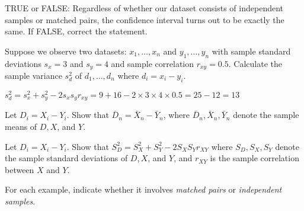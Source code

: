 \documentclass[addpoints,12pt]{exam}
\begin{document}
\begin{questions}
  \question TRUE or FALSE: Regardless of whether our dataset consists of independent samples or matched pairs, the confidence interval turns out to be exactly the same. If FALSE, correct the statement.

  \question Suppose we observe two datasets: $x_1, \dots, x_n$ and $y_1, \dots, y_n$ with sample standard deviations $s_x = 3$ and $s_y = 4$ and sample correlation $r_{xy} = 0.5$.
  Calculate the sample variance $s_d^2$ of $d_1, \dots, d_n$ where $d_i = x_i - y_i$.
  \begin{solution}
    $s_d^2 = s_x^2 + s_y^2 - 2 s_x s_y r_{xy} = 9 + 16 - 2 \times 3 \times 4 \times 0.5 = 25 - 12 = 13$
  \end{solution}

\question Let $D_i = X_i - Y_i$. Show that $\bar{D}_n = \bar{X}_n - \bar{Y}_n$, where $\bar{D}_n, \bar{X}_n, \bar{Y}_n$ denote the sample means of $D, X$, and  $Y$.

\question Let $D_i = X_i - Y_i$. Show that $S_D^2 = S_X^2 + S_Y^2 - 2 S_X S_Y r_{XY}$ where $S_D, S_X, S_Y$ denote the sample standard deviations of $D, X$, and $Y$, and $r_{XY}$ is the sample correlation between $X$ and $Y$.

\question For each example, indicate whether it involves \emph{matched pairs} or \emph{independent samples}.


\end{questions}
\end{document}
